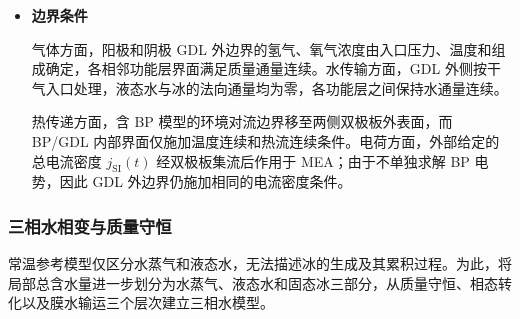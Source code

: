 \documentclass[bwprint]{gmcmthesis}
\numberwithin{equation}{section}
\numberwithin{figure}{section}
\begin{document}
\begin{itemize}
 对于 \(-20\,^\circ\text{C}\) 和 \(-25\,^\circ\text{C}\) 两种实验工况，分别取
\begin{equation}
T_0 = 253.15\,\text{K}, \qquad T_0 = 248.15\,\text{K}.
\label{eq:src:4-9}
\end{equation}

 含双极板模型中，该初始温度同时赋予 MEA 和两侧 BP。初始孔隙液态水及冰满足
\begin{equation}
m_l(x,0) = 0, \qquad m_i(x,0) = 0.
\label{eq:src:4-10}
\end{equation}

 PEM 初始膜含水量取附件给定的$\lambda_0 = 3$， 相应未冻束缚水质量浓度为$38.7 \times 3 = 116.1\,\text{kg}\,\text{m}^{-3}$。

 阳、阴极均采用干气入口，因此孔隙初始水蒸气取零；初始气体浓度根据 \(p = 101325\,\text{Pa}\)、入口气体组成及理想气体状态方程计算。

\item \textbf {边界条件}

气体方面，阳极和阴极 GDL 外边界的氢气、氧气浓度由入口压力、温度和组成确定，各相邻功能层界面满足质量通量连续。水传输方面，GDL 外侧按干气入口处理，液态水与冰的法向通量均为零，各功能层之间保持水通量连续。

热传递方面，含 BP 模型的环境对流边界移至两侧双极板外表面，而 BP/GDL 内部界面仅施加温度连续和热流连续条件。电荷方面，外部给定的总电流密度 \(j_{\mathrm{SI}}(t)\) 经双极板集流后作用于 MEA；由于不单独求解 BP 电势，因此 GDL 外边界仍施加相同的电流密度条件。


\end{itemize}


\subsubsection{三相水相变与质量守恒}
常温参考模型仅区分水蒸气和液态水，无法描述冰的生成及其累积过程。为此，将局部总含水量进一步划分为水蒸气、液态水和固态冰三部分，从质量守恒、相态转化以及膜水输运三个层次建立三相水模型。
\end{document}
